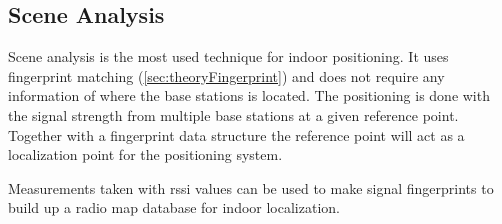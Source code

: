 \subsection{Scene Analysis}\label{sec:theoryRssiSceneAnalysis} Scene analysis
is the most used technique for indoor positioning.  It uses fingerprint matching
(\cref{sec:theoryFingerprint}) and does not require any information of where the
base stations is located.  The positioning is done with the signal strength from
multiple base stations at a given reference point.  Together with a fingerprint
data structure the reference point will act as a localization point for the
positioning system.\cite{IndoorFingerprintPositioning2017} 

\bigskip

Measurements taken with \acrshort{rssi} values can be used to make signal
fingerprints to build up a radio map database for indoor
localization.\cite{DevelopmentMobileIndoor2017} 
